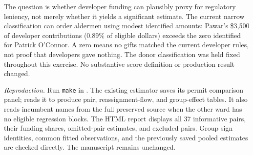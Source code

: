 The question is whether developer funding can plausibly proxy for regulatory leniency, not merely whether it yields a significant estimate. The current narrow classification can order aldermen using modest identified amounts: Pawar's \$3,500 of developer contributions (0.89\% of eligible dollars) exceeds the zero identified for Patrick O'Connor. A zero means no gifts matched the current developer rules, not proof that developers gave nothing. The donor classification was held fixed throughout this exercise. No substantive score definition or production result changed.

\textit{Reproduction.} Run \texttt{make} in
. The existing estimator saves its permit comparison panel;  reads it to produce pair, reassignment-flow, and group-effect tables. It also reads incumbent names from the full preserved source when the other ward has no eligible regression blocks. The HTML report displays all 37 informative pairs, their funding shares, omitted-pair estimates, and excluded pairs. Group sign identities, common fitted observations, and the previously saved pooled estimates are checked directly. The manuscript remains unchanged.
